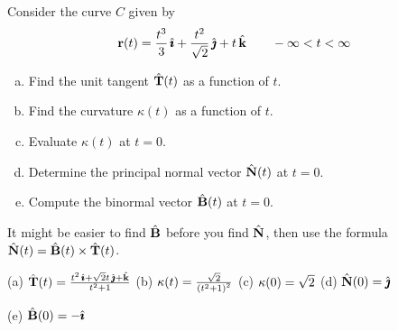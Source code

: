 \begin{question}[M317 2012J] %
Consider the curve $C$ given by
\begin{equation*}
\mathbf{r}(t) =\frac{t^3}{3}\,\hat{\pmb{\imath}} + \frac{t^2}{\sqrt{2}}\,\hat{\pmb{\jmath}} + t\,\hat{\mathbf{k}} \qquad
-\infty < t < \infty
\end{equation*}
\begin{enumerate}[(a)]
\item
Find the unit tangent $\hat{\mathbf{T}}(t)$ as a function of $t$.
\item
Find the curvature $\kappa(t)$ as a function of $t$.
\item
Evaluate $\kappa(t)$ at $t = 0$.
\item
Determine the principal normal vector $\hat{\mathbf{N}}(t)$ at $t = 0$.
\item
Compute the binormal vector $\hat{\mathbf{B}}(t)$ at $t = 0$.
\end{enumerate}
\end{question}

\begin{hint} 
It might be easier to find $\hat{\mathbf{B}}$ before you find $\hat{\mathbf{N}}$, then use the formula $\hat{\mathbf{N}}(t)=\hat{\mathbf{B}}(t)\times\hat{\mathbf{T}}(t)$.
\end{hint}

\begin{answer} 
(a) $\hat{\mathbf{T}}(t)=\frac{t^2\,\hat{\pmb{\imath}} + \sqrt{2} t\,\hat{\pmb{\jmath}} + \hat{\mathbf{k}}}{t^2+1}$\qquad
(b) $\kappa(t) =\frac{\sqrt{2}}{{(t^2+1)}^2}$\qquad
(c) $\kappa(0) = \sqrt{2}$\qquad
(d) $\hat{\mathbf{N}}(0) = \hat{\pmb{\jmath}}$\qquad

(e) $\hat{\mathbf{B}}(0) = -\hat{\pmb{\imath}}$
\end{answer}

